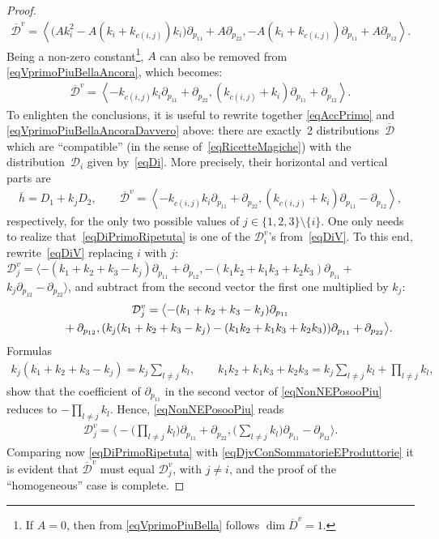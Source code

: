 \documentclass[10pt,a4paper]{amsart}
\newcommand{\D}{\mathcal{D}}
\newcommand{\Span}[1]{\left\langle #1 \right\rangle}
\numberwithin{equation}{section}
\begin{document}
\begin{proof}
\begin{gather}\label{eqVprimoPiuBellaAncora}
\overline{\D}^v= \Span{\big(Ak_i^2-A(k_i+k_{c(i,j)})k_i\big)\partial_{p_{11}}+A\partial_{p_{22}}, -A(k_i+k_{c(i,j)})\partial_{p_{11}}+A\partial_{p_{12}}}.
\end{gather}
Being a non-zero constant\footnote{If $A=0$, then from \eqref{eqVprimoPiuBella} follows $\dim\overline{D}^v=1$.}, $A$ can also be removed from \eqref{eqVprimoPiuBellaAncora}, which becomes:
 \begin{gather}\label{eqVprimoPiuBellaAncoraDavvero}
\overline{\D}^v= \Span{ -k_{c(i,j)}k_i\partial_{p_{11}}+\partial_{p_{22}}, (k_{c(i,j)}+k_i)\partial_{p_{11}}+\partial_{p_{12}}}.
\end{gather}
To enlighten the conclusions, it is useful to rewrite together \eqref{eqAccPrimo} and \eqref{eqVprimoPiuBellaAncoraDavvero} above: there are exactly~2 distributions~$\overline{\D}$ which are ``compatible'' (in the sense of~\eqref{eqRicetteMagiche}) with the distribution~$\D_i$ given by~\eqref{eqDi}. More precisely, their horizontal and vertical parts are
\begin{gather}
\overline{h} = D_1 +k_jD_2,\qquad
\overline{\D}^v = \Span{ -k_{c(i,j)}k_i\partial_{p_{11}}+\partial_{p_{22}}, (k_{c(i,j)}+k_i)\partial_{p_{11}}-\partial_{p_{12}}},\label{eqDiPrimoRipetuta}
\end{gather}
respectively, for the only two possible values of $ j\in \{1,2,3\}{\setminus}\{i\}$. One only needs to reali\-ze that~\eqref{eqDiPrimoRipetuta} is one of the $\D_i^v$'s from~\eqref{eqDiV}.
To this end, rewrite~\eqref{eqDiV} replacing $i$ with $j$:
$\D_j^v=\langle -(k_1+k_2+k_3-k_j) \partial_{p_{11}} + \partial_{p_{12}}, -(k_1k_2+k_1k_3+k_2k_3)\partial_{p_{11}}+$ $k_j \partial_{p_{12}}- \partial_{p_{22}} \rangle$,
and subtract from the second vector the f\/irst one multiplied by $k_j$:
\begin{gather}
\D_j^v=\big\langle {-}(k_1+k_2+k_3-k_j) \partial_{p_{11}} \nonumber\\
\hphantom{\D_j^v=\big\langle}{} + \partial_{p_{12}}, (k_j(k_1+k_2+k_3-k_j)-(k_1k_2+k_1k_3+k_2k_3))\partial_{p_{11}} + \partial_{p_{22}} \big\rangle.\label{eqNonNEPosooPiu}
\end{gather}
Formulas
\begin{gather*}
k_j(k_1+k_2+k_3-k_j) = k_j\sum_{l\neq j}k_l, \qquad
k_1k_2+k_1k_3+k_2k_3 = k_j\sum_{l\neq j}k_l +\prod_{l\neq j}k_l,
\end{gather*}
show that the coef\/f\/icient of $\partial_{p_{11}} $ in the second vector of \eqref{eqNonNEPosooPiu} reduces to $-\prod\limits_{l\neq j}k_l$. Hence, \eqref{eqNonNEPosooPiu} reads
\begin{gather}\label{eqDjvConSommatorieEProduttorie}
\D_j^v=\bigg\langle{-}\bigg(\prod_{l\neq j}k_l \bigg)\partial_{p_{11}} + \partial_{p_{22}},\bigg( \sum_{l\neq j}k_l\bigg) \partial_{p_{11}} - \partial_{p_{12}} \bigg\rangle.
\end{gather}
Comparing now \eqref{eqDiPrimoRipetuta} with \eqref{eqDjvConSommatorieEProduttorie} it is evident that $\overline{\D}^v$ must equal $\D_j^v$, with $j\neq i$, and the proof of the ``homogeneous'' case is complete.


\end{proof}
\end{document}
